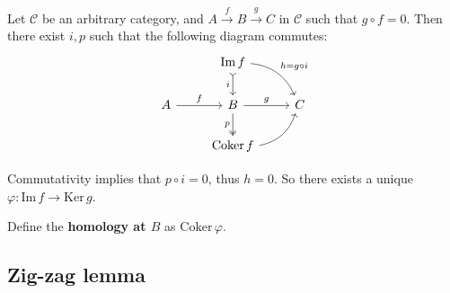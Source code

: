 \documentclass[10pt]{article}
\newcommand{\ccat}{\mathcal{C}}
\newcommand{\Coker}{\mathrm{Coker}\,}
\renewcommand{\Im}{\mathrm{Im}\,}
\newcommand{\Ker}{\mathrm{Ker}\,}
\begin{document}
            Let $\ccat$ be an arbitrary category, and $A\xrightarrow{f}B\xrightarrow{g}C$ in $\ccat$ such that $g\circ f=0$.
            Then there exist $i,p$ such that the following diagram commutes:
            \begin{equation*}
                \begin{tikzcd}
                    & \Im f \dar[tail,swap]{i} \ar[bend left=30]{dr}{h=g\circ i} &\\
                    A \rar{f} & B \rar{g} \dar[two heads,swap]{p} & C\\
                    & \Coker f \ar[bend right=30]{ur} &
                \end{tikzcd}
            \end{equation*}

            Commutativity implies that $p\circ i=0$, thus $h=0$.
            So there exists a unique \mbox{$\varphi\colon\Im f\to\Ker g$.}

            \medskip
            
            Define the \textbf{homology at $B$} as $\Coker\varphi$.

        \subsection{Zig-zag lemma}
\end{document}
